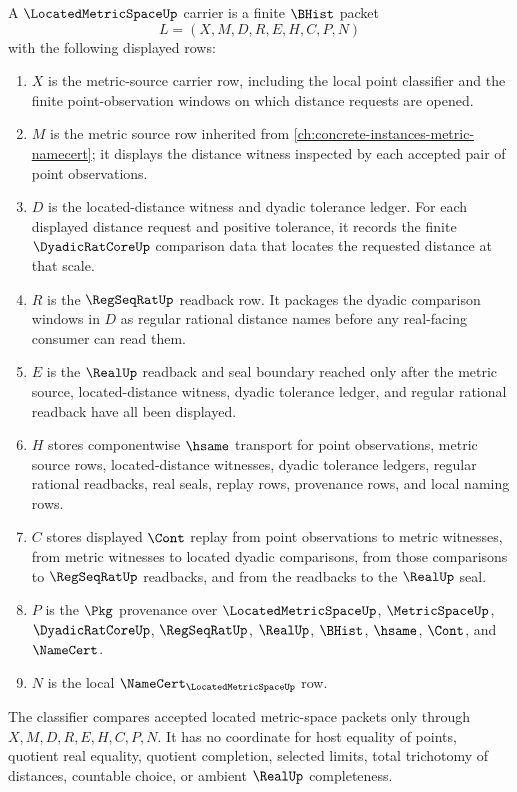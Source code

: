 \begin{definition}
\label{def:located-metric-space-carrier}
A $\LocatedMetricSpaceUp$ carrier is a finite $\BHist$ packet
$$
L=(X,M,D,R,E,H,C,P,N)
$$
with the following displayed rows:
\begin{enumerate}
\item $X$ is the metric-source carrier row, including the local point classifier and the finite point-observation windows on which distance requests are opened.
\item $M$ is the metric source row inherited from \autoref{ch:concrete-instances-metric-namecert}; it displays the distance witness inspected by each accepted pair of point observations.
\item $D$ is the located-distance witness and dyadic tolerance ledger. For each displayed distance request and positive tolerance, it records the finite $\DyadicRatCoreUp$ comparison data that locates the requested distance at that scale.
\item $R$ is the $\RegSeqRatUp$ readback row. It packages the dyadic comparison windows in $D$ as regular rational distance names before any real-facing consumer can read them.
\item $E$ is the $\RealUp$ readback and seal boundary reached only after the metric source, located-distance witness, dyadic tolerance ledger, and regular rational readback have all been displayed.
\item $H$ stores componentwise $\hsame$ transport for point observations, metric source rows, located-distance witnesses, dyadic tolerance ledgers, regular rational readbacks, real seals, replay rows, provenance rows, and local naming rows.
\item $C$ stores displayed $\Cont$ replay from point observations to metric witnesses, from metric witnesses to located dyadic comparisons, from those comparisons to $\RegSeqRatUp$ readbacks, and from the readbacks to the $\RealUp$ seal.
\item $P$ is the $\Pkg$ provenance over $\LocatedMetricSpaceUp$, $\MetricSpaceUp$, $\DyadicRatCoreUp$, $\RegSeqRatUp$, $\RealUp$, $\BHist$, $\hsame$, $\Cont$, and $\NameCert$.
\item $N$ is the local $\NameCert_{\LocatedMetricSpaceUp}$ row.
\end{enumerate}
The classifier compares accepted located metric-space packets only through $X,M,D,R,E,H,C,P,N$. It has no coordinate for host equality of points, quotient real equality, quotient completion, selected limits, total trichotomy of distances, countable choice, or ambient $\RealUp$ completeness.
\end{definition}

